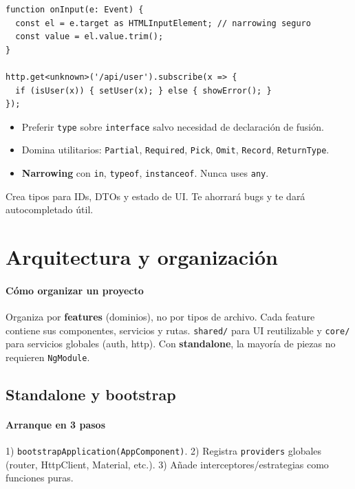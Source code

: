\documentclass[11pt,a4paper]{article}
\begin{document}
\begin{lstlisting}[style=tsstyle, caption={Narrowing en handlers y datos HTTP}]
function onInput(e: Event) {
  const el = e.target as HTMLInputElement; // narrowing seguro
  const value = el.value.trim();
}

http.get<unknown>('/api/user').subscribe(x => {
  if (isUser(x)) { setUser(x); } else { showError(); }
});
\end{lstlisting}

\begin{itemize}[leftmargin=*]
  \item Preferir \texttt{type} sobre \texttt{interface} salvo necesidad de declaración de fusión.
  \item Domina utilitarios: \texttt{Partial}, \texttt{Required}, \texttt{Pick}, \texttt{Omit}, \texttt{Record}, \texttt{ReturnType}.
  \item \textbf{Narrowing} con \texttt{in}, \texttt{typeof}, \texttt{instanceof}. Nunca uses \texttt{any}.
\end{itemize}

\begin{tipbox}
Crea tipos para IDs, DTOs y estado de UI. Te ahorrará bugs y te dará autocompletado útil.
\end{tipbox}

\section{Arquitectura y organización}
\paragraph{Cómo organizar un proyecto}
Organiza por \textbf{features} (dominios), no por tipos de archivo. Cada feature contiene sus componentes, servicios y rutas. \texttt{shared/} para UI reutilizable y \texttt{core/} para servicios globales (auth, http). Con \textbf{standalone}, la mayoría de piezas no requieren \texttt{NgModule}.

\subsection{Standalone y bootstrap}
\paragraph{Arranque en 3 pasos}
1) \texttt{bootstrapApplication(AppComponent)}. 2) Registra \texttt{providers} globales (router, HttpClient, Material, etc.). 3) Añade interceptores/estrategias como funciones puras.
\end{document}
